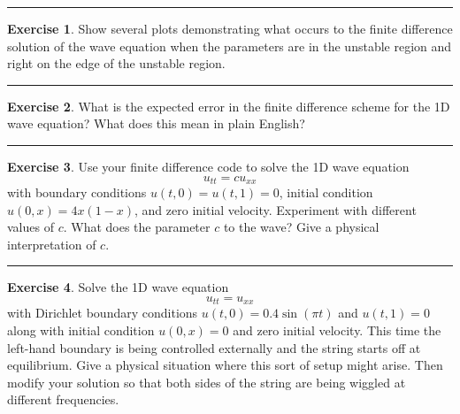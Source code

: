 \documentclass[
]{book}
\theoremstyle{definition}
\theoremstyle{definition}
\theoremstyle{definition}
\newtheorem{exercise}{Exercise}[chapter]
\theoremstyle{remark}
\begin{document}
\begin{center}\rule{0.5\linewidth}{0.5pt}\end{center}

\begin{exercise}
\protect\hypertarget{exr:unnamed-chunk-577}{}{\label{exr:unnamed-chunk-577} }Show several plots demonstrating what occurs to the finite difference solution of the wave equation when the parameters are in the unstable region and right on the edge of the unstable region.
\end{exercise}

\begin{center}\rule{0.5\linewidth}{0.5pt}\end{center}

\begin{exercise}
\protect\hypertarget{exr:unnamed-chunk-578}{}{\label{exr:unnamed-chunk-578} }What is the expected error in the finite difference scheme for the 1D wave equation? What does this mean in plain English?
\end{exercise}

\begin{center}\rule{0.5\linewidth}{0.5pt}\end{center}

\begin{exercise}
\protect\hypertarget{exr:unnamed-chunk-579}{}{\label{exr:unnamed-chunk-579} }Use your finite difference code to solve the 1D wave equation
\[ u_{tt} = c u_{xx} \]
with boundary conditions \(u(t,0) = u(t,1) = 0\), initial condition \(u(0,x) = 4x(1-x)\), and zero initial velocity. Experiment with different values of \(c\). What does the parameter \(c\) to the wave? Give a physical interpretation of \(c\).
\end{exercise}

\begin{center}\rule{0.5\linewidth}{0.5pt}\end{center}

\begin{exercise}
\protect\hypertarget{exr:unnamed-chunk-580}{}{\label{exr:unnamed-chunk-580} }Solve the 1D wave equation
\[ u_{tt} = u_{xx} \]
with Dirichlet boundary conditions \(u(t,0) = 0.4 \sin(\pi t)\) and \(u(t,1) = 0\) along with initial condition \(u(0,x) = 0\) and zero initial velocity. This time the left-hand boundary is being controlled externally and the string starts off at equilibrium. Give a physical situation where this sort of setup might arise. Then modify your solution so that both sides of the string are being wiggled at different frequencies.
\end{exercise}
\end{document}
